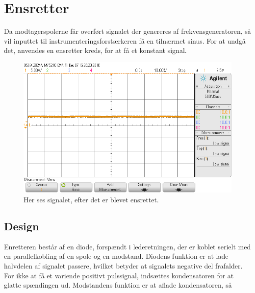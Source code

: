 \section{Ensretter}\label{sec:ensretter}
Da modtagerspolerne får overført signalet der genereres af frekvensgeneratoren, så vil inputtet til instrumenteringsforstærkeren få en tilnærmet sinus. 
For at undgå det, anvendes en ensretter kreds, for at få et konstant signal.
\begin{figure}[h!]
	\centering
	\includegraphics[width=1\textwidth]{billeder/ensretter_png.png}
	\caption{Her ses signalet, efter det er blevet ensrettet.}
	\label{fig:filter_out}
\end{figure}

\subsection{Design}
Enretteren består af en diode, forspændt i lederetningen, der er koblet serielt med en parallelkobling af en spole og en modstand. 
Diodens funktion er at lade halvdelen af signalet passere, hvilket betyder at signalets negative del frafalder. 
For ikke at få et variende positivt pulssignal, indsættes kondensatoren for at glatte spændingen ud. Modstandens funktion er at aflade kondensatoren, så



